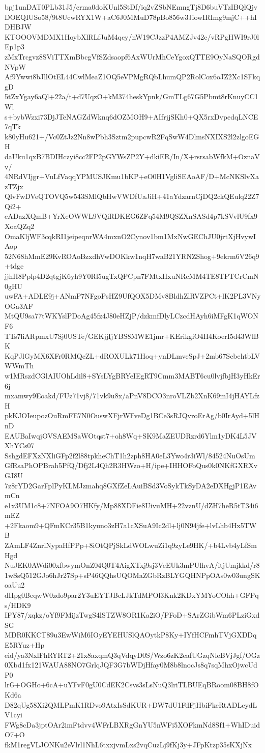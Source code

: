 bpj1unDAT0PLb31J5/crma0doKUnl5StDf/iq2vZSbNEmngTj8D6buVTzIBQlQjv
DOEQIUSo58/9t8UcwRYX1W+aC6J0MMuD78pBo856w3JiowIRImg9mjC++hIDHBJW
KTOOOVMDMX1HoybXlRLfJuM4qcy/nW19CJzzP4AMZJv42c/vRPgHWI9rJ0lEp1p3
zMxTrcgvz8SViTTXmBbcgVfSZdsaopf6AxWUrMhCeYgoxQTTE9OyNaSQORgdNVpW
Af9Ywwi8bJllOtEL44CwlMeaZ1OQ5eVPMgRQbLhumQP2RolCox6oJZ2Xc1SFkqgD
5tZxYgay6aQl+22a/t+d7UqzO+kM374heskYpnk/GmTLg67G5Pbmt8rKnuyCC1Wl
s+bybWzxi73DjJTeNAGZdWknq6dOZMOH9+AIfrjjSKh0+QX5rxDvpedqLNCE7qTk
k80yHu621+/Vc0ZtJz2Nn8wPbh3Sztm2pupcwR2FqSwW4DlmsNXIXS2l2zlgoEGH
daUku1qxB7BDIHczyi8cc2FP2pGYWsZP2Y+dkiER/In/X+rsrsabWfkM+OznaVv/
4NRdVIjgr+VuLfVaqqYPMUSJKmu1bKP+eO0H1VgliSEAoAF/D+McNKSlvXazTZjx
QlvFwDVeQTOVQ5w543SMlQbHwVWDfUaJiH+41aYdzarnCjDQ2ckQEulq22Z7Qi2+
eADazXQmB+YrXeOWWL9VQiRDKEG6ZFq54M9QSZXnSASd4p7kSVvlU9fx9XoaQZq2
OmaKljWF3cqkRI1jeipeqnrWA4mxnO2Cynov1bm1MxNwGEChJU0jrtXjHvywIAop
52N68hMmE29KvROAoBzxdhVwDOKkw1nqH7waB21YRNZShog+9ekrm6V26q9+tdge
jjhH8Pplp4D2qtgjK6yh9Y0Rl5ugTxQPCpn7FMtxHxuNRcMM4TE8TPTCrCmN0gHU
uwFA+ADLE9j+ANmP7NFgoPsHZ9UfQOX5DMv8BldhZlRVZPCt+lK2PL3VNyOGa3AF
MtQU9sa77tWKYslPDoAg45fz4J80eHZjP/dzkmfDlyLCzcdHAyh6iMFgK1qWONF6
TTs7liARpmxU7Sj0USTe/GEKjjIjYBS8MWE1jmr+KErikgiO4H4KoerI5d43WlBK
KqPJlGyMX6XFr0RMQcZL+dROXULk71Hoq+ynDLmveSpJ+2mb67ScbehtbLVWWmTh
w1MRszdCGlAIUOhLdil8+SYsLYgBRYeIEgRT9Cmm3MABT6cu0lvjfbjH3yHkEr6j
mxamwy9Eoakd/FUz71vj8/71vk9u8x/aPnV8DCO3nroVLZb2XnK69mI4jHAYLfzH
pkKJOIeupozOuRmFE7N0OuswXFjrWFveDg1BCe3sRJQvroErAg/b0IrAyd+5lHnD
EAUBaIwqjOVSAEMSaWOtqst7+oh8Wq+SK9MaZEUDRzrd6Ylm1yDK4L5JVXhYCs07
SshgdEFXzNXliGFp2f2l88tpkheChT1h2zph8HA0eL3Ywo4r3iWl/84524NuOsUm
GfRsaPhOPBrah5PfQ/Dfj2L4Qh2R3HWzo+H/ipe+IHHOFoQus0k0NKfGXRXvGJ8U
7z8rYD2GarFplPyKLMJzmahq8GXfZeLAuiBSd3VoSykTkSyDA2eDXHgjP1EAvmCn
e1x3UM1c8+7NFOA9O7HKfy/Mp88XDFie8UivuMH+22vznU/dZH7heR5tT34i6mEZ
+2Fkaom9+QFmKCr35B1kyuno3zH7a1cXSuA9Ic2dl+lj0N94jfe+lvLhb4Hx5TWB
ZAmLF4ZnrlNypaHfPPp+8iOtQPjSkLdWOLwuZi1q9zyLe9HK/+b4Lvb4yLfSmHgd
NuJEK0AWdi00xfbwymOnZ04Q0T4AigXTxj9sj3VeEUk3mPUlhvA/itjUmjkkd/r8
1wSsQ512GJo6hJr27Sp+sP46QQhsUQOMaZGbRzBLYGQHNPpOAs0w03ungSKoaUu2
dHpg0BeqwW0zdo9par2Y3uEYTJBcLJkTdMPOl3Knk2KDxYMYoCOhh+GFPqs/HDK9
IFY87/xqkz/oYf9FMijzTwgS4lSTZW8OR1Ka2iO/PFoD+SArZGibWm6PLziGxdSG
MDR0KKCT89u3EwWiM6IOyEYEHUSlQAOytkP8Ky+IYfHCFmhTVjGXDDqE5RYuz+Hp
eid/ya3NxlFhRYRT2+21x8axqmQ3qVdqyD0S/Wzo6zK2eafUGzqNleBVjJgf/OGz
0Xbd1fx121WAUA88NO7GrlqJQF3G7bWDjHfay0M8b8lnocJs8q7sqMhxOjwcUdP0
lrG+OGHo+6cA+uYFvF0gU0CdEK2Csvs3sLsNuQ3lriTLBUEqBRoom08BH8fOKd6a
D82qUg58Xi2QMLPmK1RDvo9AtxIsSdKUR+DW7dU1FdFjHbiFkeRtADLcydLV1cyi
FWg8cDa3jptOAr2imFtdvv4WFrLBXRgGnYU5nWFi5XOFkmNd8Sf1+WhIDuidO7+O
fkM1regVLJONKu2eVlrl1NhL6txxjvmLxs2vqCuzLj9fKj3y+JFpKtzp35sKXjNx
